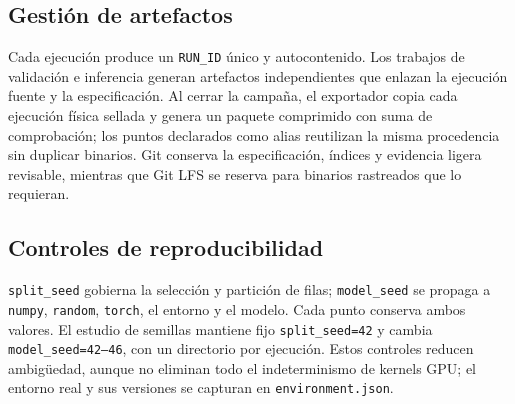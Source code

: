 \subsection{Gestión de artefactos}
Cada ejecución produce un \texttt{RUN\_ID} único y autocontenido. Los trabajos de validación e inferencia generan artefactos independientes que enlazan la ejecución fuente y la especificación. Al cerrar la campaña, el exportador copia cada ejecución física sellada y genera un paquete comprimido con suma de comprobación; los puntos declarados como alias reutilizan la misma procedencia sin duplicar binarios. Git conserva la especificación, índices y evidencia ligera revisable, mientras que Git LFS se reserva para binarios rastreados que lo requieran.

\subsection{Controles de reproducibilidad}
\texttt{split\_seed} gobierna la selección y partición de filas; \texttt{model\_seed} se propaga a \texttt{numpy}, \texttt{random}, \texttt{torch}, el entorno y el modelo. Cada punto conserva ambos valores. El estudio de semillas mantiene fijo \texttt{split\_seed=42} y cambia \texttt{model\_seed=42--46}, con un directorio por ejecución. Estos controles reducen ambigüedad, aunque no eliminan todo el indeterminismo de kernels GPU; el entorno real y sus versiones se capturan en \texttt{environment.json}.
